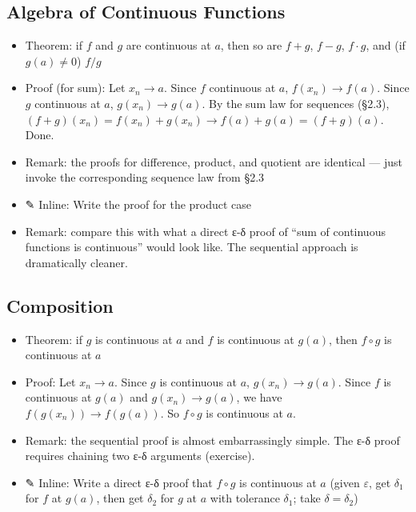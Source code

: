 \documentclass[
  10pt,
  letterpaper,
]{scrbook}
\providecommand{\tightlist}{%
  \setlength{\itemsep}{0pt}\setlength{\parskip}{0pt}}
\begin{document}
\subsection{Algebra of Continuous
Functions}\label{algebra-of-continuous-functions}

\begin{itemize}
\tightlist
\item
  Theorem: if \(f\) and \(g\) are continuous at \(a\), then so are
  \(f + g\), \(f - g\), \(f \cdot g\), and (if \(g(a) \neq 0\)) \(f/g\)
\item
  Proof (for sum): Let \(x_n \to a\). Since \(f\) continuous at \(a\),
  \(f(x_n) \to f(a)\). Since \(g\) continuous at \(a\),
  \(g(x_n) \to g(a)\). By the sum law for sequences (§2.3),
  \((f+g)(x_n) = f(x_n) + g(x_n) \to f(a) + g(a) = (f+g)(a)\). Done.
\item
  Remark: the proofs for difference, product, and quotient are identical
  --- just invoke the corresponding sequence law from §2.3
\item
  ✎ Inline: Write the proof for the product case
\item
  Remark: compare this with what a direct ε-δ proof of ``sum of
  continuous functions is continuous'' would look like. The sequential
  approach is dramatically cleaner.
\end{itemize}

\subsection{Composition}\label{composition}

\begin{itemize}
\tightlist
\item
  Theorem: if \(g\) is continuous at \(a\) and \(f\) is continuous at
  \(g(a)\), then \(f \circ g\) is continuous at \(a\)
\item
  Proof: Let \(x_n \to a\). Since \(g\) is continuous at \(a\),
  \(g(x_n) \to g(a)\). Since \(f\) is continuous at \(g(a)\) and
  \(g(x_n) \to g(a)\), we have \(f(g(x_n)) \to f(g(a))\). So
  \(f \circ g\) is continuous at \(a\).
\item
  Remark: the sequential proof is almost embarrassingly simple. The ε-δ
  proof requires chaining two ε-δ arguments (exercise).
\item
  ✎ Inline: Write a direct ε-δ proof that \(f \circ g\) is continuous at
  \(a\) (given \(\varepsilon\), get \(\delta_1\) for \(f\) at \(g(a)\),
  then get \(\delta_2\) for \(g\) at \(a\) with tolerance \(\delta_1\);
  take \(\delta = \delta_2\))
\end{itemize}
\end{document}
